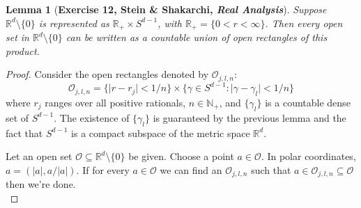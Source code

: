 \documentclass[11pt]{article}
\theoremstyle{theorem}
\newtheorem{lemma}[theorem]{Lemma}
\begin{document}
\begin{lemma}[\textbf{Exercise 12, Stein \& Shakarchi, \textit{Real Analysis}}]  Suppose $\mathbb{R}^d \setminus \{0\}$ is represented as $\mathbb{R}_+ \times S^{d-1}$, with $\mathbb{R}_+ = \{ 0 < r < \infty \}$. Then every open set in $\mathbb{R}^d\setminus \{ 0 \}$  can be written as a countable union of open rectangles of this product. 
\end{lemma}

\begin{proof}
Consider the open rectangles denoted by $\mathcal{O}_{j,l,n}$:
\begin{equation*}
    \mathcal{O}_{j,l,n} = \{ \vert r - r_j \vert < 1/n \} \times \{ \gamma \in S^{d-1} : \vert \gamma - \gamma_l \vert < 1/n\}
\end{equation*}
where $r_j$ ranges over all positive rationals, $n\in \mathbb{N}_+$, and $\{ \gamma_l \}$ is a countable dense set of $S^{d-1}$. The existence of $\{ \gamma_l \}$ is guaranteed by the previous lemma and the fact that $S^{d-1}$ is a compact subspace of the metric space $\mathbb{R}^d$.  

Let an open set $\mathcal{O} \subseteq \mathbb{R}^d \setminus \{ 0 \}$ be given. Choose a point $a\in \mathcal{O}$. In polar coordinates, $a = (\vert a \vert, a/\vert a\vert)$. If for every $a \in \mathcal{O}$ we can find an $\mathcal{O}_{j,l,n}$ such that $a\in \mathcal{O}_{j,l,n} \subseteq \mathcal{O}$ then we're done. \\


\end{proof}
\end{document}
